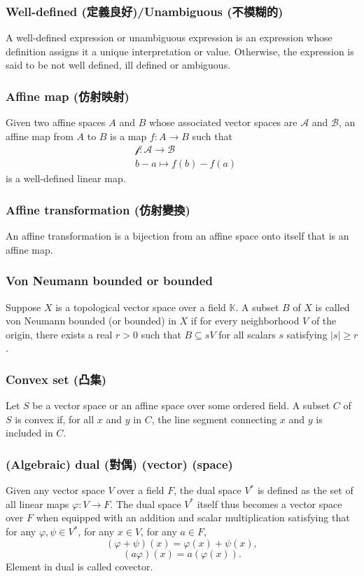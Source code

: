 \documentclass[a4paper,12pt]{report}
\begin{document}
\subsubsection{Well-defined (定義良好)/Unambiguous (不模糊的)}
A well-defined expression or unambiguous expression is an expression whose definition assigns it a unique interpretation or value. Otherwise, the expression is said to be not well defined, ill defined or ambiguous.
\subsubsection{Affine map (仿射映射)}
Given two affine spaces $A$ and $B$ whose associated vector spaces are $\mathscr{A}$ and $\mathscr{B}$, an affine map from $A$ to $B$ is a map $f\colon A\to B$ such that
\[\begin{aligned}
&\mathscr{f}\colon\mathscr{A}\to\mathscr{B}\\
&b-a\mapsto f(b)-f(a)
\end{aligned}\]
is a well-defined linear map.
\subsubsection{Affine transformation (仿射變換)}
An affine transformation is a bijection from an affine space onto itself that is an affine map.
\subsubsection{Von Neumann bounded or bounded}
Suppose $X$ is a topological vector space over a field $\mathbb{K}$. A subset $B$ of $X$ is called von Neumann bounded (or bounded) in $X$ if for every neighborhood $V$ of the origin, there exists a real $r>0$ such that $B\subseteq sV$ for all scalars $s$ satisfying $|s|\geq r$.
\subsubsection{Convex set (凸集)}
Let $S$ be a vector space or an affine space over some ordered field. A subset $C$ of $S$ is convex if, for all $x$ and $y$ in $C$, the line segment connecting $x$ and $y$ is included in $C$.
\subsubsection{(Algebraic) dual (對偶) (vector) (space)}
Given any vector space $V$ over a field $F$, the dual space $V^*$ is defined as the set of all linear maps $\varphi\colon V\to F$. The dual space $V^*$ itself thus becomes a vector space over $F$ when equipped with an addition and scalar multiplication satisfying that for any $\varphi ,\psi \in V^*$, for any $x\in V$, for any $a\in F$,
\[(\varphi+\psi)(x)=\varphi (x)+\psi (x),\]
\[(a\varphi )(x)=a\left(\varphi (x)\right).\]
Element in dual is called covector.
\end{document}
